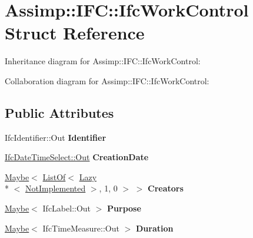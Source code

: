 \hypertarget{struct_assimp_1_1_i_f_c_1_1_ifc_work_control}{\section{Assimp\+:\+:I\+F\+C\+:\+:Ifc\+Work\+Control Struct Reference}
\label{struct_assimp_1_1_i_f_c_1_1_ifc_work_control}
}


Inheritance diagram for Assimp\+:\+:I\+F\+C\+:\+:Ifc\+Work\+Control\+:


Collaboration diagram for Assimp\+:\+:I\+F\+C\+:\+:Ifc\+Work\+Control\+:
\subsection*{Public Attributes}
\begin{DoxyCompactItemize}
\item 
\hypertarget{struct_assimp_1_1_i_f_c_1_1_ifc_work_control_a292e12a60d24b116c2233d8543a3322a}{Ifc\+Identifier\+::\+Out {\bfseries Identifier}}\label{struct_assimp_1_1_i_f_c_1_1_ifc_work_control_a292e12a60d24b116c2233d8543a3322a}

\item 
\hypertarget{struct_assimp_1_1_i_f_c_1_1_ifc_work_control_a48245786d8e9a52690d78769b6e2019d}{\hyperlink{classboost_1_1shared__ptr}{Ifc\+Date\+Time\+Select\+::\+Out} {\bfseries Creation\+Date}}\label{struct_assimp_1_1_i_f_c_1_1_ifc_work_control_a48245786d8e9a52690d78769b6e2019d}

\item 
\hypertarget{struct_assimp_1_1_i_f_c_1_1_ifc_work_control_a645c4cef0cc28a20fed3ad31761845e1}{\hyperlink{struct_assimp_1_1_s_t_e_p_1_1_maybe}{Maybe}$<$ \hyperlink{struct_assimp_1_1_s_t_e_p_1_1_list_of}{List\+Of}$<$ \hyperlink{struct_assimp_1_1_s_t_e_p_1_1_lazy}{Lazy}\\*
$<$ \hyperlink{struct_assimp_1_1_i_f_c_1_1_not_implemented}{Not\+Implemented} $>$, 1, 0 $>$ $>$ {\bfseries Creators}}\label{struct_assimp_1_1_i_f_c_1_1_ifc_work_control_a645c4cef0cc28a20fed3ad31761845e1}

\item 
\hypertarget{struct_assimp_1_1_i_f_c_1_1_ifc_work_control_a16783289b63207e20a511b8c0b4c9a9d}{\hyperlink{struct_assimp_1_1_s_t_e_p_1_1_maybe}{Maybe}$<$ Ifc\+Label\+::\+Out $>$ {\bfseries Purpose}}\label{struct_assimp_1_1_i_f_c_1_1_ifc_work_control_a16783289b63207e20a511b8c0b4c9a9d}

\item 
\hypertarget{struct_assimp_1_1_i_f_c_1_1_ifc_work_control_a562b17a26173f6ac9691ede2306b13d8}{\hyperlink{struct_assimp_1_1_s_t_e_p_1_1_maybe}{Maybe}$<$ Ifc\+Time\+Measure\+::\+Out $>$ {\bfseries Duration}}\label{struct_assimp_1_1_i_f_c_1_1_ifc_work_control_a562b17a26173f6ac9691ede2306b13d8}


\end{DoxyCompactItemize}

